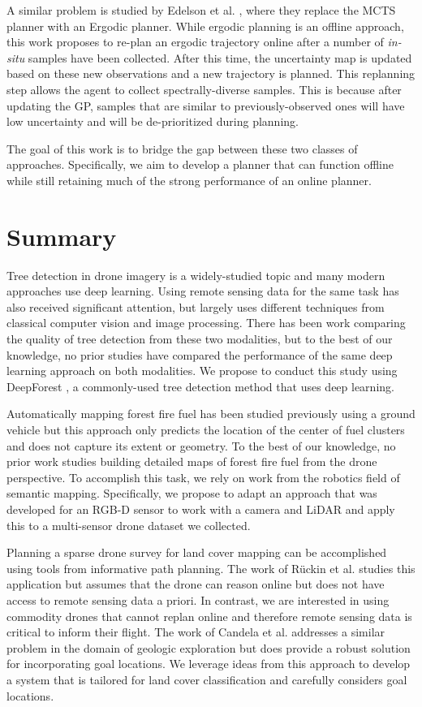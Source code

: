 A similar problem is studied by Edelson et al. \cite{Edelson2020ErgodicGathering}, where they replace the MCTS planner with an Ergodic planner. While ergodic planning is an offline approach, this work proposes to re-plan an ergodic trajectory online after a number of \textit{in-situ} samples have been collected. After this time, the uncertainty map is updated based on these new observations and a new trajectory is planned. This replanning step allows the agent to collect spectrally-diverse samples. This is because after updating the GP, samples that are similar to previously-observed ones will have low uncertainty and will be de-prioritized during planning.

The goal of this work is to bridge the gap between these two classes of approaches. Specifically, we aim to develop a planner that can function offline while still retaining much of the strong performance of an online planner.

\section{Summary}
Tree detection in drone imagery is a widely-studied topic and many modern approaches use deep learning. Using remote sensing data for the same task has also received significant attention, but largely uses different techniques from classical computer vision and image processing. There has been work comparing the quality of tree detection from these two modalities, but to the best of our knowledge, no prior studies have compared the performance of the same deep learning approach on both modalities. We propose to conduct this study using DeepForest \cite{Weinstein2020DeepForest:Delineation}, a commonly-used tree detection method that uses deep learning.

Automatically mapping forest fire fuel has been studied previously using a ground vehicle \cite{couceiro2019semfire} but this approach only predicts the location of the center of fuel clusters and does not capture its extent or geometry. To the best of our knowledge, no prior work studies building detailed maps of forest fire fuel from the drone perspective. To accomplish this task, we rely on work from the robotics field of semantic mapping. Specifically, we propose to adapt an approach that was developed for an RGB-D sensor \cite{semantic_slam_RGBD} to work with a camera and LiDAR and apply this to a multi-sensor drone dataset we collected.

Planning a sparse drone survey for land cover mapping can be accomplished using tools from informative path planning. The work of Rückin et al. \cite{Ruckin2022} studies this application but assumes that the drone can reason online but does not have access to remote sensing data a priori. In contrast, we are interested in using commodity drones that cannot replan online and therefore remote sensing data is critical to inform their flight. The work of Candela et al. \cite{Candela2020PlanetaryMapping} addresses a similar problem in the domain of geologic exploration but does provide a robust solution for incorporating goal locations. We leverage ideas from this approach to develop a system that is tailored for land cover classification and carefully considers goal locations. 